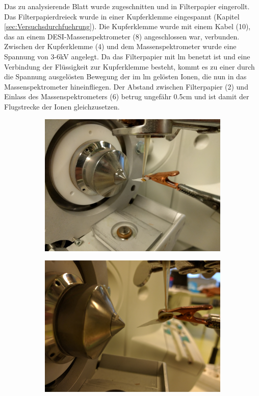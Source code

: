 Das zu analysierende Blatt wurde zugeschnitten und in Filterpapier eingerollt. Das Filterpapierdreieck wurde in einer Kupferklemme eingespannt (Kapitel \ref{sec:Versuchsdurchfuehrung}). Die Kupferklemme wurde mit einem Kabel (10), das an einem DESI-Massenspektrometer (8) angeschlossen war, verbunden. Zwischen der Kupferklemme (4) und dem Massenspektrometer wurde eine Spannung von 3-6kV angelegt. Da das Filterpapier mit \gls{lm} benetzt ist und eine Verbindung der Flüssigkeit zur Kupferklemme besteht, kommt es zu einer durch die Spannung ausgelösten Bewegung der im \gls{lm} gelösten Ionen, die nun in das Massenspektrometer hineinfliegen. Der Abstand zwischen Filterpapier (2) und Einlass des Massenspektrometers (6) betrug ungefähr 0.5cm und ist damit der Flugstrecke der Ionen gleichzusetzen. 

\begin{figure}[htbp]
  \begin{subfigure}[b]{0.5\textwidth}
    \includegraphics[width=\textwidth]{figures/Kapitel4/VWA_MSLeafspray_Detail1.jpg}
    \caption{}
    \label{fig:MSLeafsprayDetail1}
  \end{subfigure}
  \hfill
  \begin{subfigure}[b]{0.5\textwidth}
    \includegraphics[width=\textwidth]{figures/Kapitel4/VWA_MSLeafspray_Detail2.jpg}

\end{subfigure}
\end{figure}
